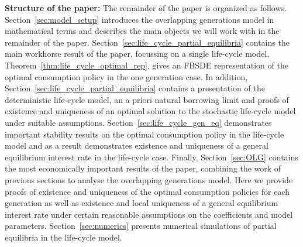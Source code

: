 \documentclass[11pt,oneside,english,reqno,dvipsnames,table]{amsart}
\numberwithin{equation}{section}
\theoremstyle{plain}
\theoremstyle{definition}
\theoremstyle{remark}
\theoremstyle{plain}
\theoremstyle{plain}
\theoremstyle{plain}
\theoremstyle{plain}
\theoremstyle{plain}
\theoremstyle{plain}
\theoremstyle{plain}
\numberwithin{thm}{section}
\begin{document}
\textbf{Structure of the paper:} The remainder of the paper is organized as follows. Section~\ref{sec:model_setup} introduces the overlapping generations model in mathematical terms and describes the main objects we will work with in the remainder of the paper. Section~\ref{sec:life_cycle_partial_equilibria} contains the main workhorse result of the paper, focussing on a single life-cycle model,  Theorem~\ref{thm:life_cycle_optimal_rep}, gives an FBSDE representation of the optimal consumption policy in the one generation case. In addition, Section~\ref{sec:life_cycle_partial_equilibria} contains a presentation of the deterministic life-cycle model, an a priori natural borrowing limit and proofs of existence and uniqueness of an optimal solution to the stochastic life-cycle model under suitable assumptions. Section~\ref{sec:life_cycle_gen_eq} demonstrates important stability results on the optimal consumption policy in the life-cycle model and as a result demonstrates existence and uniqueness of a general equilibrium interest rate in the life-cycle case. Finally, Section~\ref{sec:OLG} contains the most economically important results of the paper, combining the work of previous sections to analyse the overlapping generations model. Here we provide proofs of existence and uniqueness of the optimal consumption policies for each generation as well as existence and local uniqueness of a general equilibrium interest rate under certain reasonable assumptions on the coefficients and model parameters. Section~\ref{sec:numerics} presents numerical simulations of partial equilibria in the life-cycle model.
\end{document}
